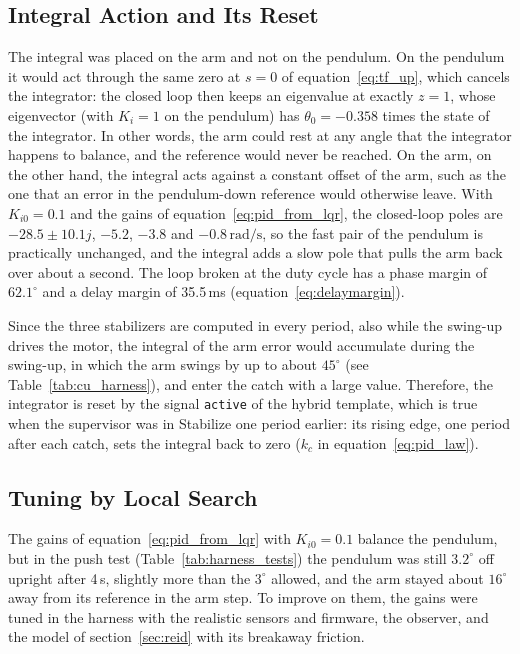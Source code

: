 \documentclass[a4paper,11pt]{article}
\begin{document}
\subsection{Integral Action and Its Reset}
\label{sec:pid_integral}
The integral was placed on the arm and not on the pendulum. On the pendulum it would act through the same zero at $s = 0$ of equation~\ref{eq:tf_up}, which cancels the integrator: the closed loop then keeps an eigenvalue at exactly $z = 1$, whose eigenvector (with $K_{i} = 1$ on the pendulum) has $\theta_0 = -0.358$ times the state of the integrator. In other words, the arm could rest at any angle that the integrator happens to balance, and the reference would never be reached. On the arm, on the other hand, the integral acts against a constant offset of the arm, such as the one that an error in the pendulum-down reference would otherwise leave. With $K_{i0} = 0.1$ and the gains of equation~\ref{eq:pid_from_lqr}, the closed-loop poles are $-28.5 \pm 10.1j$, $-5.2$, $-3.8$ and $-0.8\,\mathrm{rad/s}$, so the fast pair of the pendulum is practically unchanged, and the integral adds a slow pole that pulls the arm back over about a second. The loop broken at the duty cycle has a phase margin of $62.1^\circ$ and a delay margin of 35.5\,ms (equation~\ref{eq:delaymargin}).

Since the three stabilizers are computed in every period, also while the swing-up drives the motor, the integral of the arm error would accumulate during the swing-up, in which the arm swings by up to about $45^\circ$ (see Table~\ref{tab:cu_harness}), and enter the catch with a large value. Therefore, the integrator is reset by the signal \texttt{active} of the hybrid template, which is true when the supervisor was in Stabilize one period earlier: its rising edge, one period after each catch, sets the integral back to zero ($k_c$ in equation~\ref{eq:pid_law}).

\subsection{Tuning by Local Search}
\label{sec:pid_tuning}
The gains of equation~\ref{eq:pid_from_lqr} with $K_{i0} = 0.1$ balance the pendulum, but in the push test (Table~\ref{tab:harness_tests}) the pendulum was still $3.2^\circ$ off upright after 4\,s, slightly more than the $3^\circ$ allowed, and the arm stayed about $16^\circ$ away from its reference in the arm step. To improve on them, the gains were tuned in the harness with the realistic sensors and firmware, the observer, and the model of section~\ref{sec:reid} with its breakaway friction.
\end{document}
